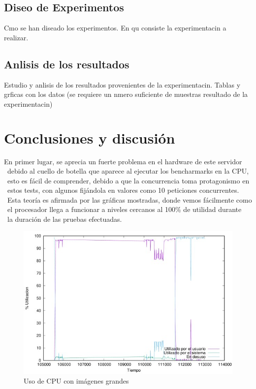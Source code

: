 \documentclass[11pt,twoside,a4paper]{book}
\begin{document}
\section{Diseo de Experimentos}
Cmo se han diseado los experimentos. En qu consiste la experimentacin a realizar.

\section{Anlisis de los resultados}
Estudio y anlisis de los resultados provenientes de la experimentacin. Tablas y grficas con los datos (se requiere un nmero suficiente de muestras resultado de la experimentacin)

\chapter{Conclusiones y discusión}

En primer lugar, se aprecia un fuerte problema en el hardware de este servidor \
debido al cuello de botella que aparece al ejecutar los bencharmarks en la CPU, \
esto es fácil de comprender, debido a que la concurrencia toma protagonismo en \
estos tests, con algunos fijándola en valores como 10 peticiones concurrentes. \
Esta teoría es afirmada por las gráficas mostradas, donde vemos fácilmente como \
el procesador llega a funcionar a niveles cercanos al 100\% de utilidad durante \
la duración de las pruebas efectuadas.

\begin{figure}[H]
   \includegraphics[width=\textwidth]{cpugrandes.jpg}
   \caption{Uso de CPU con imágenes grandes}
   \label{cpu1}
\end{figure}
\end{document}
